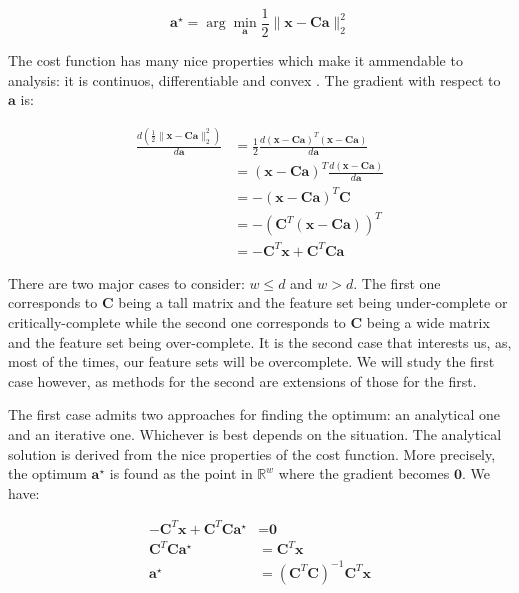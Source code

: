\documentclass[12pt,a4paper,oneside,english]{UPBThesis}
\newcommand{\hcweightspace}{\mathbb{R}^w}
\begin{document}
\begin{equation}
\textbf{a}^{\star} = \arg\min_{\textbf{a}} \frac{1}{2} \| \textbf{x} - \textbf{C}\textbf{a} \|_2^2
\end{equation}

The cost function has many nice properties which make it ammendable to analysis: it is continuos, differentiable and convex \cite{elements-statistical-learning}. The gradient with respect to $\textbf{a}$ is:

\begin{align*}
\frac{d \left( \frac{1}{2}\|\textbf{x} - \textbf{C}\textbf{a}\|_2^2 \right)}{d\textbf{a}} & = \frac{1}{2} \frac{d {\left( \textbf{x} - \textbf{C}\textbf{a} \right)}^T\left( \textbf{x} - \textbf{C}\textbf{a} \right)}{d\textbf{a}} \\
& = {\left( \textbf{x} - \textbf{C}\textbf{a} \right)}^T \frac{d \left( \textbf{x} - \textbf{C}\textbf{a} \right)}{d\textbf{a}} \\
& = - {\left( \textbf{x} - \textbf{C}\textbf{a} \right)}^T \textbf{C} \\
& = - {\left( \textbf{C}^T \left( \textbf{x} - \textbf{C}\textbf{a} \right) \right)}^T \\
& = - \textbf{C}^T \textbf{x} + \textbf{C}^T\textbf{C}\textbf{a}
\end{align*}

There are two major cases to consider: $w \leq d$ and $w > d$. The first one corresponds to $\textbf{C}$ being a tall matrix and the feature set being under-complete or critically-complete while the second one corresponds to $\textbf{C}$ being a wide matrix and the feature set being over-complete. It is the second case that interests us, as, most of the times, our feature sets will be overcomplete. We will study the first case however, as methods for the second are extensions of those for the first.

The first case admits two approaches for finding the optimum: an analytical one and an iterative one. Whichever is best depends on the situation. The analytical solution is derived from the nice properties of the cost function. More precisely, the optimum $\textbf{a}^\star$ is found as the point in $\hcweightspace$ where the gradient becomes $\textbf{0}$. We have:

\begin{align*}
- \textbf{C}^T \textbf{x} + \textbf{C}^T\textbf{C}\textbf{a}^\star & = \textbf{0} \\
\textbf{C}^T\textbf{C}\textbf{a}^\star & = \textbf{C}^T\textbf{x} \\
\textbf{a}^\star & = {\left( \textbf{C}^T\textbf{C} \right)}^{-1} \textbf{C}^T\textbf{x}
\end{align*}
\end{document}
